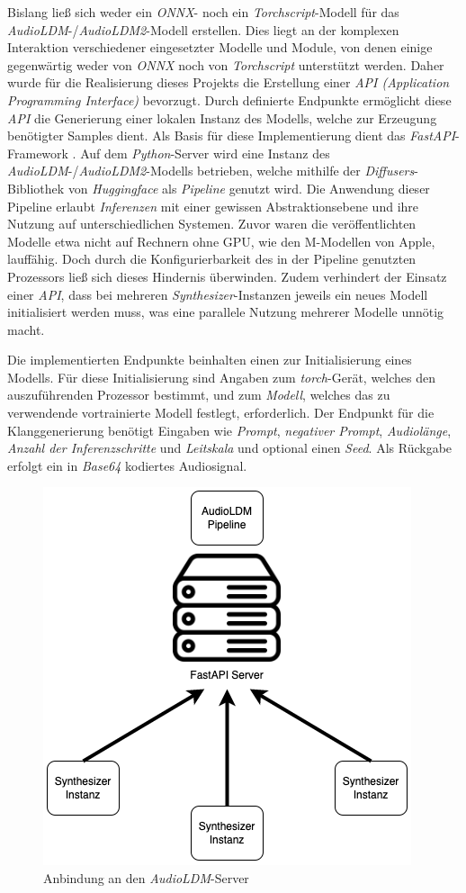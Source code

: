 \documentclass[
  a4paper,  %
  twoside,  %
  bibliography=totoc,
  headsepline,
  cleardoublepage=empty,
  parskip=half,
  draft=false
]{scrbook}
\begin{document}
Bislang ließ sich weder ein \emph{ONNX}- noch ein \emph{Torchscript}-Modell für das \emph{AudioLDM}-/\emph{AudioLDM2}-Modell erstellen. Dies liegt an der komplexen Interaktion verschiedener eingesetzter Modelle und Module, von denen einige gegenwärtig weder von \emph{ONNX} noch von \emph{Torchscript} unterstützt werden. Daher wurde für die Realisierung dieses Projekts die Erstellung einer \emph{API (Application Programming Interface)} bevorzugt. Durch definierte Endpunkte ermöglicht diese \emph{API} die Generierung einer lokalen Instanz des Modells, welche zur Erzeugung benötigter Samples dient. Als Basis für diese Implementierung dient das \emph{FastAPI}-Framework \cite{noauthor_fastapi_nodate}. Auf dem \emph{Python}-Server wird eine Instanz des \emph{AudioLDM}-/\emph{AudioLDM2}-Modells betrieben, welche mithilfe der \emph{Diffusers}-Bibliothek \cite{von_platen_diffusers_2023} von \emph{Huggingface} \cite{noauthor_hugging_2023} als \emph{Pipeline} \cite{noauthor_huggingface-audioldm_nodate, noauthor_huggingface-audioldm2_nodate} genutzt wird. Die Anwendung dieser Pipeline erlaubt \emph{Inferenzen} mit einer gewissen Abstraktionsebene und ihre Nutzung auf unterschiedlichen Systemen. Zuvor waren die veröffentlichten Modelle etwa nicht auf Rechnern ohne GPU, wie den M-Modellen von Apple, lauffähig. Doch durch die Konfigurierbarkeit des in der Pipeline genutzten Prozessors ließ sich dieses Hindernis überwinden. Zudem verhindert der Einsatz einer \emph{API}, dass bei mehreren \emph{Synthesizer}-Instanzen jeweils ein neues Modell initialisiert werden muss, was eine parallele Nutzung mehrerer Modelle unnötig macht.

Die implementierten Endpunkte beinhalten einen zur Initialisierung eines Modells. Für diese Initialisierung sind Angaben zum \emph{torch}-Gerät, welches den auszuführenden Prozessor bestimmt, und zum \emph{Modell}, welches das zu verwendende vortrainierte Modell festlegt, erforderlich. Der Endpunkt für die Klanggenerierung benötigt Eingaben wie \emph{Prompt}, \emph{negativer Prompt}, \emph{Audiolänge}, \emph{Anzahl der Inferenzschritte} und \emph{Leitskala} und optional einen \emph{Seed}. Als Rückgabe erfolgt ein in \emph{Base64} kodiertes Audiosignal.

\begin{figure}
  \centering
  \includegraphics[width=.4\textwidth]{graphics/Server.png}
  \caption[AudiLDM Anbindung]{Anbindung an den \emph{AudioLDM}-Server}
  \label{fig:server}
\end{figure}
\end{document}
